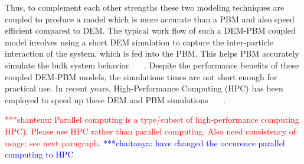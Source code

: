 \documentclass[preprint,11pt,authoryear]{elsarticle}
\newcommand{\jhanote}[1]{ {\textcolor{red} { ***shantenu: #1 }}}
\newcommand{\csnote}[1]{ {\textcolor{blue} { ***chaitanya: #1 }}}
\newcommand{\gpnote}[1]{{\textcolor{green} {***giannis: #1}}}
\newcommand{\jhanote}[1]{ {\textcolor{red} { ***shantenu: #1 }}}
\newcommand{\csnote}[1]{}
\newcommand{\gpnote}[1]{}
\begin{document}
Thus, to complement each other strengths these two modeling techniques are 
coupled to produce a model which is more accurate than a PBM and also speed  
efficient compared to DEM. The typical work flow of such a
DEM-PBM coupled model involves using a short DEM simulation to capture the
inter-particle interaction of the system, which is fed into the PBM. This helps 
PBM accurately simulate the bulk system behavior~\citep{Goldschmidt2003}
~\citep{Reinhold2012}~\citep{Barrasso2013}. Despite the performance benefits of
these coupled DEM-PBM models, the simulations times are not short enough for 
practical use. In recent years, High-Performance Computing (HPC) has 
been employed to speed up  these DEM and PBM simulations
~\citep{Gunawan2008}~\citep{Prakash2013a}~\citep{Bettencourt2017}.

\jhanote{Parallel computing is a type/subset of high-performance computing
HPC). Please use HPC rather than parallel computing. Also need consistency of
usage; see next paragraph.} \csnote{have changed the occurence parallel computing to HPC}




\end{document}
